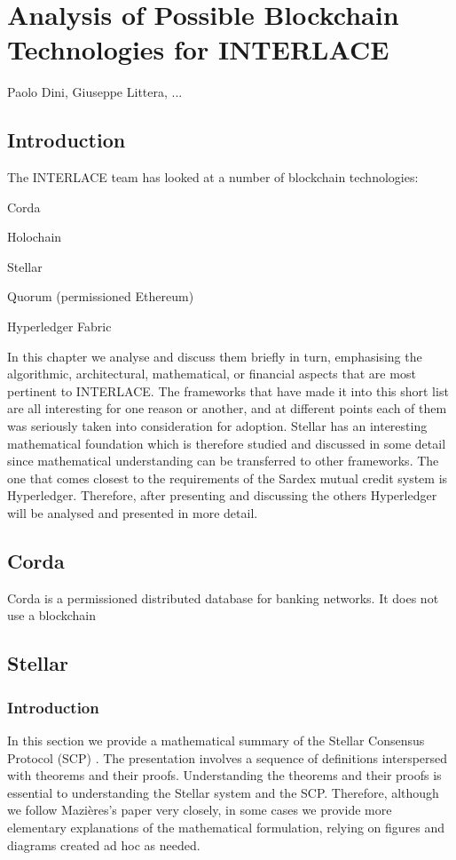\chapter{Analysis of Possible Blockchain Technologies for INTERLACE}
\label{ch:dlt}

\vspace{-1cm}
\begin{center}
Paolo Dini, Giuseppe Littera, ...
\end{center}

\section{Introduction}
The INTERLACE team has looked at a number of blockchain technologies:
\begin{packed_item1}
\item Corda
\item Holochain
\item Stellar
\item Quorum (permissioned Ethereum)
\item Hyperledger Fabric
\end{packed_item1}
In this chapter we analyse and discuss them briefly in turn, emphasising the algorithmic, architectural,  mathematical, or financial aspects that are most pertinent to INTERLACE. The frameworks that have made it into this short list are all interesting for one reason or another, and at different points each of them was seriously taken into consideration for adoption. Stellar has an interesting mathematical foundation which is therefore studied and discussed in some detail since mathematical understanding can be transferred to other frameworks. The one that comes closest to the requirements of the Sardex mutual credit system is Hyperledger. Therefore, after presenting and discussing the others Hyperledger will be analysed and presented in more detail.


\section{Corda}
Corda is a permissioned distributed database for banking networks. It does not use a blockchain






\section{Stellar}
\subsection{Introduction}
In this section we provide a mathematical summary of the Stellar Consensus Protocol (SCP) \cite{Mazieres2016}. The presentation involves a sequence of definitions interspersed with theorems and their proofs. Understanding the theorems and their proofs is essential to understanding the Stellar system and the SCP. Therefore, although we follow Mazi\`eres's paper \cite{Mazieres2016} very closely, in some cases we provide more elementary explanations of the mathematical formulation, relying on figures and diagrams created ad hoc as needed.

